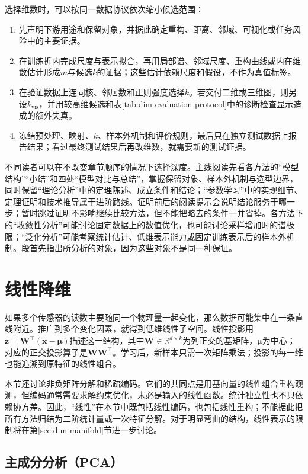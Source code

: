 选择维数时，可以按同一数据协议依次缩小候选范围：
\begin{enumerate}
  \item 先声明下游用途和保留对象，并据此确定重构、距离、邻域、可视化或任务风险中的主要证据。
  \item 在训练折内完成尺度与表示拟合，再用局部谱、邻域尺度、重构曲线或内在维数估计形成$m$与候选$k$的证据；这些估计依赖尺度和假设，不作为真值标签。
  \item 在验证数据上连同核、邻居数和正则强度选择$k$。若交付二维或三维图，则另设$k_{\mathrm{vis}}$，并用较高维候选和表\ref{tab:dim-evaluation-protocol}中的诊断检查显示造成的额外失真。
  \item 冻结预处理、映射、$k$、样本外机制和评价规则，最后只在独立测试数据上报告结果；看过最终测试结果后再改维数，就需要新的测试证据。
\end{enumerate}

不同读者可以在不改变章节顺序的情况下选择深度。主线阅读先看各方法的“模型结构”“小结”和四处“模型对比与总结”，掌握保留对象、样本外机制与选型边界，同时保留“理论分析”中的定理陈述、成立条件和结论；“参数学习”中的实现细节、定理证明和技术推导属于进阶路线。证明前后的阅读提示会说明结论服务于哪一步；暂时跳过证明不影响继续比较方法，但不能把略去的条件一并省掉。各方法下的“收敛性分析”可能讨论固定数据上的数值优化，也可能讨论采样增加时的谱极限；“泛化分析”可能考察统计估计、低维表示能力或固定训练表示后的样本外机制。段首先指出所分析的对象，因为这些对象不是同一种保证。

\section{线性降维}
\label{sec:dim-linear}

如果多个传感器的读数主要随同一个物理量一起变化，那么数据可能集中在一条直线附近。推广到多个变化因素，就得到低维线性子空间。线性投影用$\bm{z}=\bm{W}^{\top}(\bm{x}-\bm{\mu})$描述这一结构，其中$\bm{W}\in\mathbb{R}^{d\times k}$为列正交的基矩阵，$\bm{\mu}$为中心；对应的正交投影算子是$\bm{W}\bm{W}^{\top}$。学习后，新样本只需一次矩阵乘法；投影的每一维也能追溯到原特征的线性组合。

本节还讨论非负矩阵分解和稀疏编码。它们的共同点是用基向量的线性组合重构观测，但编码通常需要求解约束优化，未必是输入的线性函数。统计独立性也不只依赖协方差。因此，“线性”在本节中既包括线性编码，也包括线性重构；不能据此把所有方法归结为二阶统计量或一次特征分解。对于明显弯曲的结构，线性表示的限制将在第\ref{sec:dim-manifold}节进一步讨论。

\subsection{主成分分析（PCA）}
\label{sec:dim-pca}

